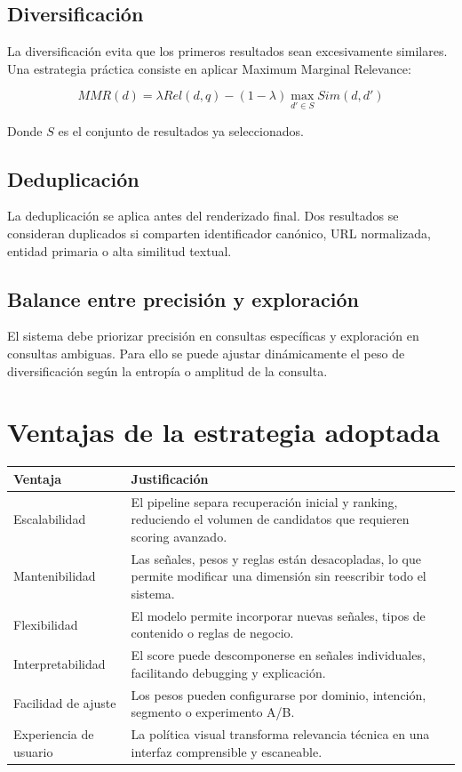 \documentclass[12pt,a4paper]{article}
\begin{document}
\subsection{Diversificación}

La diversificación evita que los primeros resultados sean excesivamente similares. Una estrategia práctica consiste en aplicar Maximum Marginal Relevance:

\[
MMR(d) = \lambda Rel(d,q) - (1-\lambda) \max_{d' \in S} Sim(d,d')
\]

Donde $S$ es el conjunto de resultados ya seleccionados.

\subsection{Deduplicación}

La deduplicación se aplica antes del renderizado final. Dos resultados se consideran duplicados si comparten identificador canónico, URL normalizada, entidad primaria o alta similitud textual.

\subsection{Balance entre precisión y exploración}

El sistema debe priorizar precisión en consultas específicas y exploración en consultas ambiguas. Para ello se puede ajustar dinámicamente el peso de diversificación según la entropía o amplitud de la consulta.

\section{Ventajas de la estrategia adoptada}

\begin{longtable}{p{4cm}p{10cm}}
\toprule
\textbf{Ventaja} & \textbf{Justificación} \\
\midrule
\endhead

Escalabilidad & El pipeline separa recuperación inicial y ranking, reduciendo el volumen de candidatos que requieren scoring avanzado. \\

Mantenibilidad & Las señales, pesos y reglas están desacopladas, lo que permite modificar una dimensión sin reescribir todo el sistema. \\

Flexibilidad & El modelo permite incorporar nuevas señales, tipos de contenido o reglas de negocio. \\

Interpretabilidad & El score puede descomponerse en señales individuales, facilitando debugging y explicación. \\

Facilidad de ajuste & Los pesos pueden configurarse por dominio, intención, segmento o experimento A/B. \\

Experiencia de usuario & La política visual transforma relevancia técnica en una interfaz comprensible y escaneable. \\

\bottomrule
\end{longtable}
\end{document}
